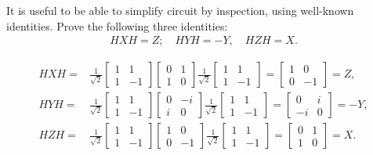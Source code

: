 \documentclass[en]{sol-man}
\begin{document}
\begin{exe}
    It is useful to be able to simplify circuit by inspection, using well-known identities. Prove the following three identities:
    \begin{align}
        HXH=Z;\quad HYH=-Y,\quad HZH=X.
    \end{align}
\end{exe}
\begin{pf}
    \begin{align}
        HXH=&\frac{1}{\sqrt{2}}\left[\begin{matrix}
            1&1\\
            1&-1
        \end{matrix}\right]\left[\begin{matrix}
            0&1\\
            1&0
        \end{matrix}\right]\frac{1}{\sqrt{2}}\left[\begin{matrix}
            1&1\\
            1&-1
        \end{matrix}\right]=\left[\begin{matrix}
            1&0\\
            0&-1
        \end{matrix}\right]=Z,\\
        HYH=&\frac{1}{\sqrt{2}}\left[\begin{matrix}
            1&1\\
            1&-1
        \end{matrix}\right]\left[\begin{matrix}
            0&-i\\
            i&0
        \end{matrix}\right]\frac{1}{\sqrt{2}}\left[\begin{matrix}
            1&1\\
            1&-1
        \end{matrix}\right]=\left[\begin{matrix}
            0&i\\
            -i&0
        \end{matrix}\right]=-Y,\\
        HZH=&\frac{1}{\sqrt{2}}\left[\begin{matrix}
            1&1\\
            1&-1
        \end{matrix}\right]\left[\begin{matrix}
            1&0\\
            0&-1
        \end{matrix}\right]\frac{1}{\sqrt{2}}\left[\begin{matrix}
            1&1\\
            1&-1
        \end{matrix}\right]=\left[\begin{matrix}
            0&1\\
            1&0
        \end{matrix}\right]=X.
    \end{align}
\end{pf}
\end{document}
